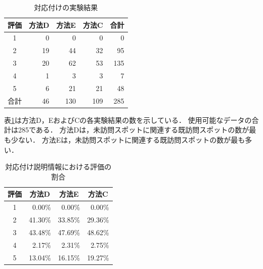 \documentclass{deimj}
\begin{document}
\begin{table}[t]
  \caption{対応付けの実験結果}
  \label{table:対応付けの実験結果}
  \centering
  \begin{tabular}{c|r|r|r|r}
  \hline
  評価 & \multicolumn{1}{c|}{方法D} & \multicolumn{1}{c|}{方法E} & \multicolumn{1}{c|}{方法C} &  \multicolumn{1}{c}{合計} \\ \hline
  1  & 0                      & 0                      & 0                       & 0                      \\
  2  & 19                     & 44                     & 32                     & 95                    \\
  3  & 20                     & 62                     & 53                      & 135                    \\
  4  & 1                      & 3                      & 3                      & 7                     \\
  5  & 6                      & 21                     & 21                     & 48                     \\\hline
  合計 & 46                     & 130                    & 109                    & 285                    \\ \hline
  \end{tabular}
\end{table}

表\ref{table:対応付けの実験結果}は方法D，EおよびCの各実験結果の数を示している．
使用可能なデータの合計は285である．
方法Dは，未訪問スポットに関連する既訪問スポットの数が最も少ない．
方法Eは，未訪問スポットに関連する既訪問スポットの数が最も多い．

\begin{table}[t]
  \caption{対応付け説明情報における評価の割合}
  \label{table:対応付け説明情報における評価の割合}
  \centering
  \begin{tabular}{c|r|r|r}
  \hline
  評価 & \multicolumn{1}{c|}{方法D} & \multicolumn{1}{c|}{方法E} & \multicolumn{1}{c}{方法C} \\ \hline
  1  & 0.00\%                     & 0.00\%                     & 0.00\% \\
  2  & 41.30\%                    & 33.85\%                    & 29.36\% \\
  3  & 43.48\%                    & 47.69\%                    & 48.62\% \\
  4  & 2.17\%                     & 2.31\%                     & 2.75\% \\
  5  & 13.04\%                    & 16.15\%                    & 19.27\% \\ \hline
  \end{tabular}
\end{table}
\end{document}
